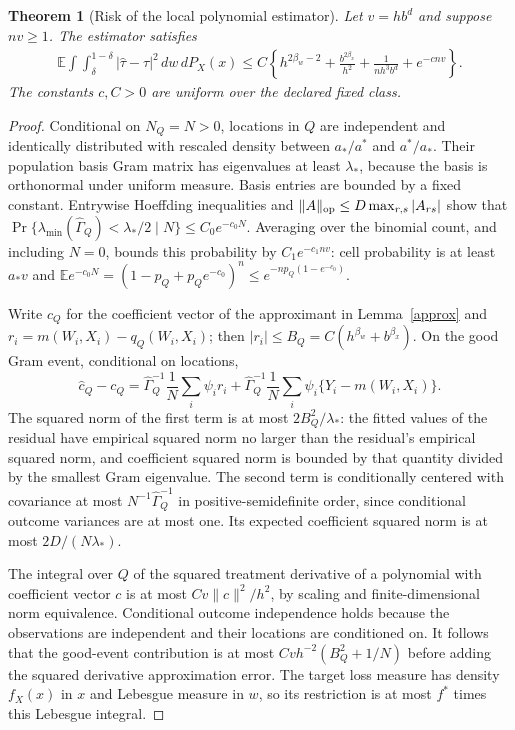 \documentclass[11pt]{article}
\newtheorem{theorem}{Theorem}
\theoremstyle{remark}\newtheorem{remark}[theorem]{Remark}
\newcommand{\E}{\mathbb E}
\begin{document}
\begin{theorem}[Risk of the local polynomial estimator]\label{upper}
Let $v=hb^d$ and suppose $nv\geq1$. The estimator satisfies
\[
 \begin{split}
 \E\int\!\int_\delta^{1-\delta}|\widehat\tau-\tau|^2\,dw\,dP_X(x)
 \leq C\left\{h^{2\beta_w-2}+\frac{b^{2\beta_x}}{h^2}
                   +\frac1{nh^3b^d}+e^{-cnv}\right\}.
 \end{split}\tag{1}
\]
The constants $c,C>0$ are uniform over the declared fixed class.
\end{theorem}
\begin{proof}
Conditional on $N_Q=N>0$, locations in $Q$ are independent and identically distributed with rescaled density between $a_*/a^*$ and $a^*/a_*$. Their population basis Gram matrix has eigenvalues at least $\lambda_*$, because the basis is orthonormal under uniform measure. Basis entries are bounded by a fixed constant. Entrywise Hoeffding inequalities and
$\|A\|_{\rm op}\leq D\max_{r,s}|A_{rs}|$
show that
$\Pr\{\lambda_{\min}(\widehat\Gamma_Q)<\lambda_*/2\mid N\}\leq C_0e^{-c_0N}$.
Averaging over the binomial count, and including $N=0$, bounds this probability by $C_1e^{-c_1nv}$: cell probability is at least $a_*v$ and
$\E e^{-c_0N}=(1-p_Q+p_Qe^{-c_0})^n\leq e^{-np_Q(1-e^{-c_0})}$.

Write $c_Q$ for the coefficient vector of the approximant in Lemma~\ref{approx} and $r_i=m(W_i,X_i)-q_Q(W_i,X_i)$; then $|r_i|\leq B_Q=C(h^{\beta_w}+b^{\beta_x})$.
On the good Gram event, conditional on locations,
\[
 \widehat c_Q-c_Q=
 \widehat\Gamma_Q^{-1}\frac1N\sum_i\psi_i r_i
 +\widehat\Gamma_Q^{-1}\frac1N\sum_i\psi_i\{Y_i-m(W_i,X_i)\}.
\]
The squared norm of the first term is at most $2B_Q^2/\lambda_*$: the fitted values of the residual have empirical squared norm no larger than the residual's empirical squared norm, and coefficient squared norm is bounded by that quantity divided by the smallest Gram eigenvalue. The second term is conditionally centered with covariance at most $N^{-1}\widehat\Gamma_Q^{-1}$ in positive-semidefinite order, since conditional outcome variances are at most one. Its expected coefficient squared norm is at most $2D/(N\lambda_*)$.

The integral over $Q$ of the squared treatment derivative of a polynomial with coefficient vector $c$ is at most $Cv\|c\|^2/h^2$, by scaling and finite-dimensional norm equivalence. Conditional outcome independence holds because the observations are independent and their locations are conditioned on. It follows that the good-event contribution is at most
$Cv h^{-2}(B_Q^2+1/N)$ before adding the squared derivative approximation error. The target loss measure has density $f_X(x)$ in $x$ and Lebesgue measure in $w$, so its restriction is at most $f^*$ times this Lebesgue integral.


\end{proof}
\end{document}
